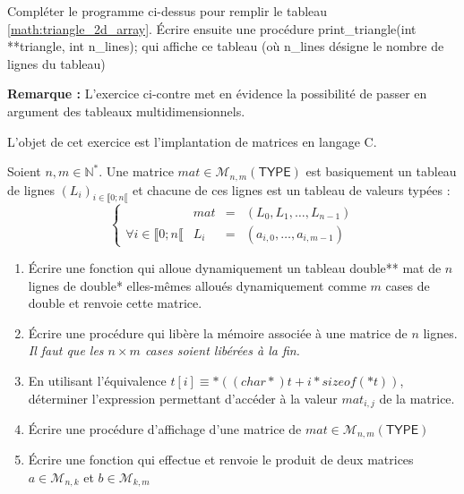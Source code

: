 \documentclass[../../../main.tex]{subfiles}
\begin{document}
 Compléter le programme ci-dessus pour remplir le tableau \ref{math:triangle_2d_array}. Écrire ensuite une procédure \textsf{print\_triangle(int **triangle, int n\_lines);} qui affiche ce tableau (où \textsf{n\_lines} désigne le nombre de lignes du tableau)
 
\textbf{Remarque :} L'exercice ci-contre met en évidence la possibilité de passer en argument des tableaux multidimensionnels.

 L'objet de cet exercice est l'implantation de matrices en langage C. 

Soient $n, m\in\mathbb{N}^{*}$. Une matrice $mat\in\mathcal{M}_{n, m}(\textsf{TYPE})$ est basiquement un tableau de lignes $(L_{i})_{i\in{\llbracket{0; n\llbracket}}}$ et chacune de ces lignes est un tableau de valeurs typées :
$$\left\{ \begin{array}{llcl}
& mat & = & \left( L_{0}, L_{1}, \dots, L_{n-1} \right) \\
\forall i \in \llbracket0; n\llbracket & L_{i} & = & \left(a_{i, 0}, \dots, a_{i, m-1} \right)
\end{array}\right.$$
\begin{enumerate}
	\item Écrire une fonction \textsf{} qui alloue dynamiquement un tableau \textsf{double** mat} de $n$ lignes de \textsf{double*} elles-mêmes alloués dynamiquement comme $m$ cases de \textsf{double} et renvoie cette matrice.
	\item Écrire une procédure \textsf{} qui libère la mémoire associée à une matrice de $n$ lignes. \textit{Il faut que les $n\times{m}$ cases soient libérées à la fin.}
	\item En utilisant l'équivalence $t[i] \equiv *((char*)t + i*sizeof(*t))$, déterminer l'expression permettant d'accéder à la valeur $mat_{i, j}$ de la matrice.
	\item Écrire une procédure d'affichage d'une matrice de $mat\in\mathcal{M}_{n, m}(\textsf{TYPE})$ \textsf{}
	\item Écrire une fonction \textsf{} qui effectue et renvoie le produit de deux matrices $a\in\mathcal{M}_{n, k}$ et $b\in\mathcal{M}_{k, m}$
\end{enumerate}
\end{document}
